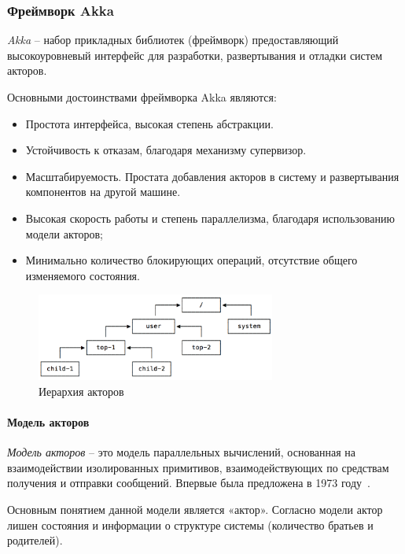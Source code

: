 \subsubsection{Фреймворк Akka}
\label{sec:techs:akka}

\emph{Akka} – набор прикладных библиотек (фреймворк) предоставляющий высокоуровневый интерфейс для разработки, развертывания и отладки систем акторов.

Основными достоинствами фреймворка Akka являются:
\begin{itemize}
  \item Простота интерфейса, высокая степень абстракции.
  \item Устойчивость к отказам, благодаря механизму супервизор.
  \item Масштабируемость. Простата добавления акторов в систему и развертывания компонентов на другой машине.
  \item Высокая скорость работы и степень параллелизма, благодаря использованию модели акторов;
  \item Минимально количество блокирующих операций, отсутствие общего изменяемого состояния.
\end{itemize}

\begin{figure}[ht]
    \centering
    \includegraphics[width=0.7\textwidth]{figures/actors_hier.png}
    \caption{Иерархия акторов}
    \label{fig:techs:akka:actor_hierar}
\end{figure}

\paragraph{Модель акторов}
\label{sec:techs:akka:actor_model}
\emph{Модель акторов} -- это модель параллельных вычислений, основанная на взаимодействии изолированных примитивов, взаимодействующих по средствам получения и отправки сообщений. Впервые была предложена в 1973 году~\cite{hewitt_bishop_steiger_actor_model}.

Основным понятием данной модели является «актор». Согласно модели актор лишен состояния и информации о структуре системы (количество братьев и родителей).


